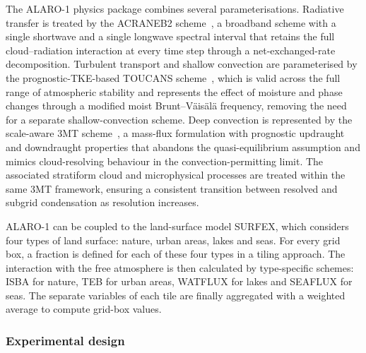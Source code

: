 \documentclass[journal abbreviation, manuscript]{copernicus}
\begin{document}

The ALARO-1 physics package combines several parameterisations.
Radiative transfer is treated by the ACRANEB2 scheme~\citep{masek_single_2016, geleyn_single_2017}, a broadband scheme with a single shortwave and a single longwave spectral interval that retains the full cloud--radiation interaction at every time step through a net-exchanged-rate decomposition.
Turbulent transport and shallow convection are parameterised by the prognostic-TKE-based TOUCANS scheme~\citep{duran_compact_2014, marquet_general_2013}, which is valid across the full range of atmospheric stability and represents the effect of moisture and phase changes through a modified moist Brunt--V\"ais\"al\"a frequency, removing the need for a separate shallow-convection scheme.
Deep convection is represented by the scale-aware 3MT scheme~\citep{gerard_cloud_2009}, a mass-flux formulation with prognostic updraught and downdraught properties that abandons the quasi-equilibrium assumption and mimics cloud-resolving behaviour in the convection-permitting limit.
The associated stratiform cloud and microphysical processes are treated within the same 3MT framework, ensuring a consistent transition between resolved and subgrid condensation as resolution increases.

ALARO-1 can be coupled to the land-surface model SURFEX, which considers four types of land surface: nature, urban areas, lakes and seas.
For every grid box, a fraction is defined for each of these four types in a tiling approach.
The interaction with the free atmosphere is then calculated by type-specific schemes: ISBA for nature, TEB for urban areas, WATFLUX for lakes and SEAFLUX for seas.
The separate variables of each tile are finally aggregated with a weighted average to compute grid-box values.

\subsubsection{Experimental design}
\end{document}
